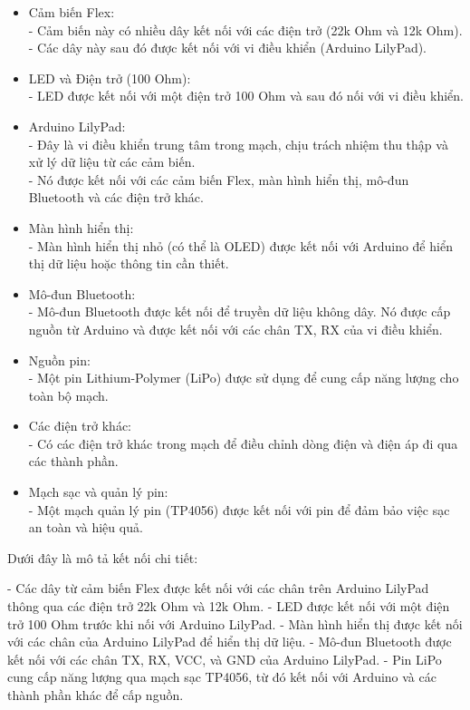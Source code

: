\begin{itemize}
    \item Cảm biến Flex:\\
   - Cảm biến này có nhiều dây kết nối với các điện trở (22k Ohm và 12k Ohm).\\
   - Các dây này sau đó được kết nối với vi điều khiển (Arduino LilyPad).
   \item LED và Điện trở (100 Ohm):\\
   - LED được kết nối với một điện trở 100 Ohm và sau đó nối với vi điều khiển.
   \item Arduino LilyPad:\\
   - Đây là vi điều khiển trung tâm trong mạch, chịu trách nhiệm thu thập và xử lý dữ liệu từ các cảm biến.\\
   - Nó được kết nối với các cảm biến Flex, màn hình hiển thị, mô-đun Bluetooth và các điện trở khác.
  \item Màn hình hiển thị:\\
   - Màn hình hiển thị nhỏ (có thể là OLED) được kết nối với Arduino để hiển thị dữ liệu hoặc thông tin cần thiết.
  \item Mô-đun Bluetooth:\\
   - Mô-đun Bluetooth được kết nối để truyền dữ liệu không dây. Nó được cấp nguồn từ Arduino và được kết nối với các chân TX, RX của vi điều khiển.
  \item  Nguồn pin:\\
   - Một pin Lithium-Polymer (LiPo) được sử dụng để cung cấp năng lượng cho toàn bộ mạch.
  \item Các điện trở khác:\\
   - Có các điện trở khác trong mạch để điều chỉnh dòng điện và điện áp đi qua các thành phần.
  \item Mạch sạc và quản lý pin:\\
   - Một mạch quản lý pin (TP4056) được kết nối với pin để đảm bảo việc sạc an toàn và hiệu quả.
\end{itemize}

Dưới đây là mô tả kết nối chi tiết:

- Các dây từ cảm biến Flex được kết nối với các chân trên Arduino LilyPad thông qua các điện trở 22k Ohm và 12k Ohm.
- LED được kết nối với một điện trở 100 Ohm trước khi nối với Arduino LilyPad.
- Màn hình hiển thị được kết nối với các chân của Arduino LilyPad để hiển thị dữ liệu.
- Mô-đun Bluetooth được kết nối với các chân TX, RX, VCC, và GND của Arduino LilyPad.
- Pin LiPo cung cấp năng lượng qua mạch sạc TP4056, từ đó kết nối với Arduino và các thành phần khác để cấp nguồn.

